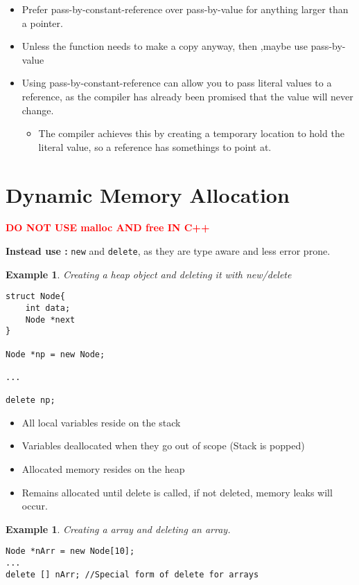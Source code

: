 \documentclass{article}
\newtheorem{ex}[theorem]{Example}
\newenvironment{ablock}[1]{%
    \tcolorbox[beamer,%
    noparskip,breakable,
    colback=lightcoral,colframe=darkred,%
    colbacklower=tomato!75!lightcoral,%
    title=#1]}%
    {\endtcolorbox}
\begin{document}
\begin{ablock}{Advice}
\begin{itemize}
\item Prefer pass-by-constant-reference over pass-by-value for anything larger than a pointer.
\item Unless the function needs to make a copy anyway, then ,maybe use pass-by-value
\item Using pass-by-constant-reference can allow you to pass literal values to a reference, as the compiler has already been promised that the value will never change.
\begin{itemize}
\item The compiler achieves this by creating a temporary location to hold the literal value, so a reference has somethings to point at.
\end{itemize}
\end{itemize}
\end{ablock}

\section{Dynamic Memory Allocation}

\textbf{\textcolor{red}{DO NOT USE malloc AND free IN C++}}

\textbf{Instead use : } \verb|new| and \verb|delete|, as they are type aware and less error prone. 

\begin{ex} Creating a heap object and deleting it with new/delete
\begin{lstlisting}
struct Node{
	int data;
	Node *next
}

Node *np = new Node;

...

delete np;
\end{lstlisting}
\end{ex}
\begin{itemize}
\item All local variables reside on the stack 
\item Variables deallocated when they go out of scope (Stack is popped)
\item Allocated memory resides on the heap 
\item Remains allocated until delete is called, if not deleted, memory leaks will occur.
\end{itemize}

\begin{ex} Creating a array and deleting an array. 
\begin{lstlisting}
Node *nArr = new Node[10];
...
delete [] nArr; //Special form of delete for arrays
\end{lstlisting}
\end{ex}
\end{document}
